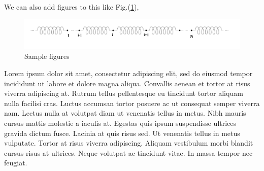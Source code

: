 We can also add figures to this like Fig.(\ref{infspring}),
\begin{figure}[h!]
	
	\centering
	\includegraphics[width = \textwidth]{chapter-1/fig/infinitespring}
	\caption{Sample figures}
	\label{infspring}
\end{figure}

Lorem ipsum dolor sit amet, consectetur adipiscing elit, sed do eiusmod tempor incididunt ut labore et dolore magna aliqua. Convallis aenean et tortor at risus viverra adipiscing at. Rutrum tellus pellentesque eu tincidunt tortor aliquam nulla facilisi cras. Luctus accumsan tortor posuere ac ut consequat semper viverra nam. Lectus nulla at volutpat diam ut venenatis tellus in metus. Nibh mauris cursus mattis molestie a iaculis at. Egestas quis ipsum suspendisse ultrices gravida dictum fusce. Lacinia at quis risus sed. Ut venenatis tellus in metus vulputate. Tortor at risus viverra adipiscing. Aliquam vestibulum morbi blandit cursus risus at ultrices. Neque volutpat ac tincidunt vitae. In massa tempor nec feugiat.\cite{ref2,ref3}


